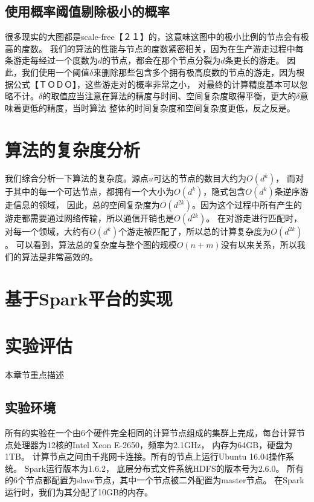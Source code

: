 \documentclass[master]{njuthesis}
\begin{document}
\subsection{使用概率阈值剔除极小的概率}
很多现实的大图都是scale-free【２１】的，这意味这图中的极小比例的节点会有极高的度数。
我们的算法的性能与节点的度数紧密相关，因为在生产游走过程中每条游走每经过一个度数为$d$的节点，都会在那个节点分裂为$d$条更长的游走。
因此，我们使用一个阈值$\delta$来删除那些包含多个拥有极高度数的节点的游走，因为根据公式【ＴＯＤＯ】，这些游走对的概率非常之小，
对最终的计算精度基本可以忽略不计。$\delta$的取值应当注意在算法的精度与时间、空间复杂度取得平衡，更大的$\delta$意味着更低的精度，当时算法
整体的时间复杂度和空间复杂度更低，反之反是。
\section{算法的复杂度分析}
我们综合分析一下算法的复杂度。源点$u$可达的节点的数目大约为$O(d^k)$，
而对于其中的每一个可达节点，都拥有一个大小为$O(d^k)$，隐式包含$O(d^k)$条逆序游走信息的领域，
因此，总的空间复杂度为$O(d^{2k})$。因为这个过程中所有产生的游走都需要通过网络传输，所以通信开销也是$O(d^{2k})$。
在对游走进行匹配时，对每一个领域，大约有$O(d^k)$个游走被匹配了，所以总的计算复杂度为$O(d^{2k})$。
可以看到，算法总的复杂度与整个图的规模$O(n+m)$没有以来关系，所以我们的算法是非常高效的。
\section{基于Spark平台的实现}

\section{实验评估}
本章节重点描述
\subsection{实验环境}
所有的实验在一个由6个硬件完全相同的计算节点组成的集群上完成，每台计算节点处理器为12核的Intel Xeon E-2650，频率为2.1GHz，
内存为64GB，硬盘为1TB。 计算节点之间由千兆网卡连接。所有的节点上运行Ubuntu 16.04操作系统。 
Spark运行版本为1.6.2， 底层分布式文件系统HDFS的版本号为2.6.0。
所有的6个节点都配置为slave节点，其中一个节点被二外配置为master节点。 
在Spark运行时，我们为其分配了10GB的内存。
\end{document}
